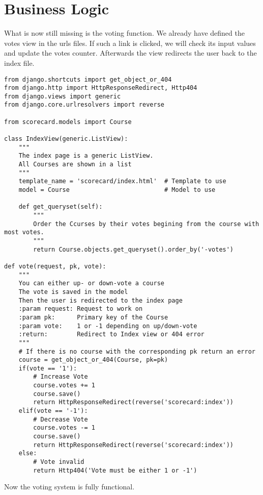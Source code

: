 \section{Business Logic}

What is now still missing is the voting function. We already have defined the votes view in the urls files. If such a link is clicked, we will check its input values and update the votes counter. Afterwards the view redirects the user back to the index file.

\begin{lstlisting}[style=Python, caption=scorecard/views.py, label=lst:views.py2]
from django.shortcuts import get_object_or_404
from django.http import HttpResponseRedirect, Http404
from django.views import generic
from django.core.urlresolvers import reverse

from scorecard.models import Course

class IndexView(generic.ListView):
    """
    The index page is a generic ListView.
    All Courses are shown in a list
    """
    template_name = 'scorecard/index.html'  # Template to use
    model = Course                          # Model to use

    def get_queryset(self):
        """
        Order the Ccurses by their votes begining from the course with most votes.
        """
        return Course.objects.get_queryset().order_by('-votes')

def vote(request, pk, vote):
    """
    You can either up- or down-vote a course
    The vote is saved in the model
    Then the user is redirected to the index page
    :param request: Request to work on
    :param pk:      Primary key of the Course
    :param vote:    1 or -1 depending on up/down-vote
    :return:        Redirect to Index view or 404 error
    """
    # If there is no course with the corresponding pk return an error
    course = get_object_or_404(Course, pk=pk)
    if(vote == '1'):
        # Increase Vote
        course.votes += 1
        course.save()
        return HttpResponseRedirect(reverse('scorecard:index'))
    elif(vote == '-1'):
        # Decrease Vote
        course.votes -= 1
        course.save()
        return HttpResponseRedirect(reverse('scorecard:index'))
    else:
        # Vote invalid
        return Http404('Vote must be either 1 or -1')
\end{lstlisting}

Now the voting system is fully functional.